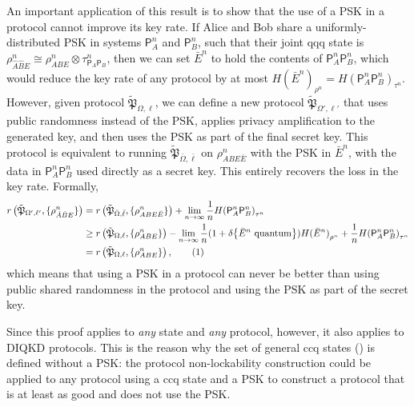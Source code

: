 \documentclass[10pt, a4paper]{article}
\numberwithin{equation}{section} %
\theoremstyle{definition}
\theoremstyle{plain}
\newcommand{\usenumber}{%
  \refstepcounter{equation}\tag{\theequation}
}
\newcommand{\?}{\mathrel{?}} %
\newcommand{\indic}[1]{\delta{\left\{#1\right\}}} %
\newcommand{\crv}[1]{\mathsf{#1}}
\newcommand{\qproto}[2][\ell]{\tilde{\mathfrak{P}}_{#2, #1}}
\begin{document}
    An important application of this result is to show that the use of a PSK in a protocol cannot improve its key rate. If Alice and Bob share a uniformly-distributed PSK in systems \(\crv{P}_{A}^n\) and \(\crv{P}_{B}^n\), such that their joint qqq state is \(\rho_{\hat{A}\hat{B}E}^n \cong \rho_{ABE}^n \otimes \tau_{\crv{P}_{A} \crv{P}_{B}}^{n}\), then we can set \(\bar{E}^n\) to hold the contents of \(\crv{P}_{A}^n \crv{P}_{B}^n\), which would reduce the key rate of any protocol by at most \({H(\bar{E}^n)}_{\rho^n} = H{( \crv{P}_{A}^n \crv{P}_{B}^n )}_{\tau^{n}}\). However, given protocol \(\qproto{\Omega}\), we can define a new protocol \(\qproto[\ell']{\Omega'}\) that uses public randomness instead of the PSK, applies privacy amplification to the generated key, and then uses the PSK as part of the final secret key. This protocol is equivalent to running \(\qproto[\bar{\ell}]{\bar{\Omega}}\) on \(\rho_{ABE\bar{E}}^n\) with the PSK in \(\bar{E}^n\), with the data in \( \crv{P}_{A}^n \crv{P}_{B}^n \) used directly as a secret key. This entirely recovers the loss in the key rate. Formally,
    \begin{align*}
      r\left(\qproto[\ell']{\Omega'}, {\{\rho_{\hat{A}\hat{B}E}^{n}\}} \right) &= r\left(\qproto[\bar{\ell}]{\bar{\Omega}}, {\{\rho_{ABE\bar{E}}^{n}\}} \right) + \lim_{n\to\infty} \frac{1}{n}H{(\crv{P}_{A}^n \crv{P}_{B}^n)}_{\tau^{n}} \\
                                                                               &\geq r\left(\qproto{\Omega}, {\{\rho_{ABE}^{n}\}} \right) - \lim_{n\to\infty} \frac{1}{n}(1+\indic{\bar{E}^n \text{ quantum}}){H(\bar{E}^n)}_{\rho^n} + \frac{1}{n}H{( \crv{P}_{A}^n \crv{P}_{B}^n )}_{\tau^{n}} \\
                                                                               &= r\left(\qproto{\Omega}, {\{\rho_{ABE}^{n}\}} \right), \usenumber
    \end{align*}
    which means that using a PSK in a protocol can never be better than using public shared randomness in the protocol and using the PSK as part of the secret key.

    Since this proof applies to \emph{any} state and \emph{any} protocol, however, it also applies to DIQKD protocols. This is the reason why the set of general ccq states () is defined without a PSK\@: the protocol non-lockability construction could be applied to any protocol using a ccq state and a PSK to construct a protocol that is at least as good and does not use the PSK\@.
\end{document}
